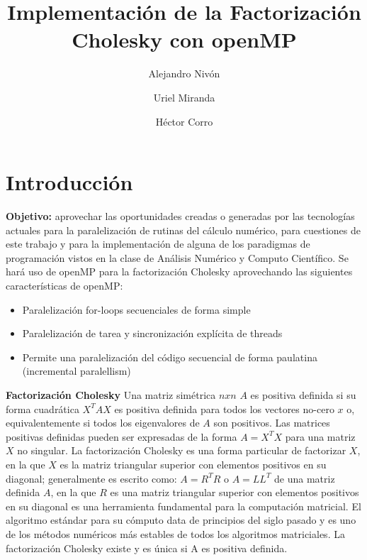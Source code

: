 \documentclass[10pt, oneside,spanish]{article}
\title{Implementación de la Factorización Cholesky con openMP}
\author[1]{Alejandro Nivón}
\author[2]{Uriel Miranda}
\author[3]{Héctor Corro}
\affil[ ]{Maestría en Ciencia de Datos}
\affil[ ]{Instituto Tecnológico Autónomo de México}
\date{}
\begin{document}
\maketitle

\section{Introducción}
   
\textbf{Objetivo:}
aprovechar las oportunidades creadas o generadas por las tecnologías actuales para la paralelización de rutinas del cálculo numérico, para cuestiones de este trabajo y para la implementación de alguna de los paradigmas de programación vistos en la clase de Análisis Numérico y Computo Científico. Se hará uso de openMP para la factorización Cholesky aprovechando las siguientes características de openMP: 


\begin{itemize}
\item Paralelización for-loops secuenciales de forma simple
\end{itemize}
\begin{itemize}
\item Paralelización de tarea y sincronización explícita de threads
\end{itemize}
\begin{itemize}
\item Permite una paralelización del código secuencial de forma paulatina (incremental paralellism)
\end{itemize}

\textbf{Factorización Cholesky} Una matriz simétrica $nxn$ $A$ es positiva definida si su forma cuadrática $X^TAX$ es positiva definida para todos los vectores no-cero $x$ o, equivalentemente si todos los eigenvalores de $A$ son positivos.
Las matrices positivas definidas pueden ser expresadas de la forma $A = X^TX$ para una matriz $X$ no singular.
La factorización Cholesky es una forma particular de factorizar $X$, en la que $X$ es la matriz triangular superior con elementos positivos en su diagonal; generalmente es escrito como: \(A = R^TR\) o $A = LL^T$ de una matriz definida \(A\), en la que \(R\) es una matriz triangular superior con elementos positivos en su diagonal es una herramienta fundamental para la computación matricial.
El algoritmo estándar para su cómputo data de principios del siglo pasado y es uno de los métodos numéricos más estables de todos los algoritmos matriciales. 
La factorización Cholesky existe y es única si A es positiva definida. \cite{choi1996design}
 
\end{document}
